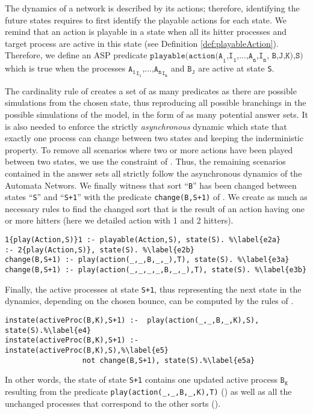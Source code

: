 The dynamics of a network is described by its actions; therefore, identifying the future states requires to first identify the playable actions for each state. We remind that an action is playable in a state when all its hitter processes and target process are active in this state (see Definition \ref{def:playableAction}). Therefore, we define an ASP predicate $\texttt{playable(action(A}_\texttt{1}\texttt{,I}_\texttt{1}\texttt{,...,A}_\texttt{n}\texttt{,I}_\texttt{n}\texttt{, B,J,K),S)}$ which is true when the processes  ${\texttt{A}_\texttt{1}}_{\texttt{I}_\texttt{1}}\texttt{,...,}{\texttt{A}_\texttt{n}}_{\texttt{I}_\texttt{n}}$ and $\texttt{B}_\texttt{J}$ are active at state \texttt{S}.

The cardinality rule of 
creates a set of as many predicates as there are possible simulations from the chosen state,
thus reproducing all possible branchings in the possible simulations of the model, in the form of as many potential answer sets. It is also needed to enforce the strictly \emph{asynchronous} dynamic
which state that exactly one process can change between two states and keeping the inderministic property.
To remove all scenarios where two or more actions have been played between
two states, we use the constraint of .
Thus, the remaining scenarios contained in the answer sets all strictly follow
the asynchronous dynamics of the Automata Networs.
We finally witness that sort ``\texttt{B}'' has been changed between states ``\texttt{S}'' and ``\texttt{S+1}'' with the predicate \texttt{change(B,S+1)} of . We create as much as necessary rules to find the changed sort that is the result of an action having one or more hitters (here we detailed action with 1 and 2 hitters).

\begin{lstlisting}
1{play(Action,S)}1 :- playable(Action,S), state(S). %\label{e2a} 
:- 2{play(Action,S)}, state(S). %\label{e2b}
change(B,S+1) :- play(action(_,_,B,_,_),T), state(S). %\label{e3a}
change(B,S+1) :- play(action(_,_,_,_,B,_,_),T), state(S). %\label{e3b}
\end{lstlisting}

Finally, the active processes at state \texttt{S+1},
thus representing the next state in the dynamics, depending on the chosen bounce,
can be computed by the rules of .
\begin{lstlisting}
instate(activeProc(B,K),S+1) :-  play(action(_,_,B,_,K),S), state(S).%\label{e4}
instate(activeProc(B,K),S+1) :-  instate(activeProc(B,K),S),%\label{e5}
				  not change(B,S+1), state(S).%\label{e5a}
\end{lstlisting}
In other words, the state of state \texttt{S+1} contains one updated active process $\texttt{B}_\texttt{K}$
resulting from the predicate \texttt{play(action(\_,\_,B,\_,K),T)} ()
as well as all the unchanged processes that correspond to the other sorts ().

